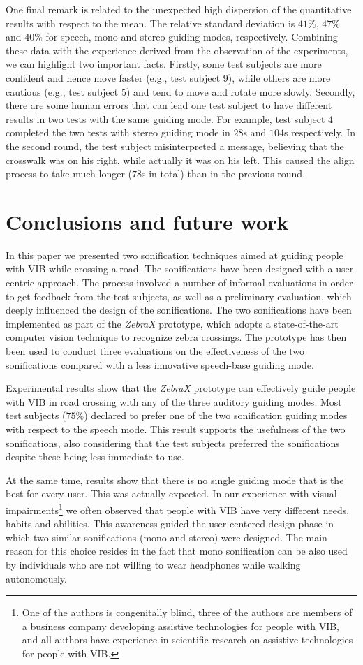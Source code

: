 \documentclass{article}
\newcommand{\zebra}{\emph{ZebraX}}
\begin{document}
One final remark is related to the unexpected high dispersion of the quantitative results with respect to the mean. The relative standard deviation is $41\%$, $47\%$ and $40\%$ for speech, mono and stereo guiding modes, respectively.
Combining these data with the experience derived from the observation of the experiments, we can highlight two important facts.
Firstly, some test subjects are more confident and hence move faster (e.g., test subject $9$), while others are more cautious (e.g., test subject $5$) and tend to move and rotate more slowly.
Secondly, there are some human errors that can lead one test subject to have different results in two tests with the same guiding mode.
For example, test subject 4 completed the two tests with stereo guiding mode in $28$s and $104$s respectively. In the second round, the test subject misinterpreted a message, believing that the crosswalk was on his right, while actually it was on his left. This caused the align process to take much longer ($78$s in total) than in the previous round.

\section{Conclusions and future work}
\label{sec:concl}
In this paper we presented two sonification techniques aimed at guiding people with VIB while crossing a road.
The sonifications have been designed with a user-centric approach. The process involved a number of informal evaluations in order to get feedback from the test subjects, as well as a preliminary evaluation, which deeply influenced the design of the sonifications.
The two sonifications have been implemented as part of the \zebra{} prototype, which adopts a state-of-the-art computer vision technique to recognize zebra crossings.
The prototype has then been used to conduct three evaluations on the effectiveness of the two sonifications compared with a less innovative speech-base guiding mode.

Experimental results show that the \zebra{} prototype can effectively guide people with VIB in road crossing with any of the three auditory guiding modes.
Most test subjects ($75\%$) declared to prefer one of the two sonification guiding modes with respect to the speech mode. This result supports the usefulness of the two sonifications, also considering that the test subjects preferred the sonifications despite these being less immediate to use.

At the same time, results show that there is no single guiding mode that is the best for every user.
This was actually expected. In our experience with visual impairments\footnote{One of the authors is congenitally blind, three of the authors are members of a business company developing assistive technologies for people with VIB, and all authors have experience in scientific research on assistive technologies for people with VIB.} we often observed that people with VIB have very different needs, habits and abilities.
This awareness guided the user-centered design phase in which two similar sonifications (mono and stereo) were designed. The main reason for this choice resides in the fact that mono sonification can be also used by individuals who are not willing to wear headphones while walking autonomously.
\end{document}
